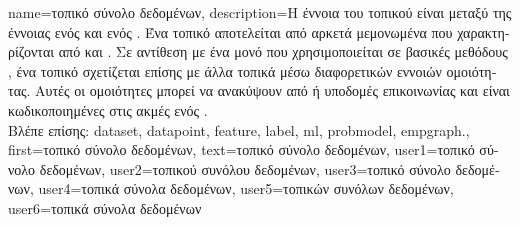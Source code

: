 {name={\foreignlanguage{greek}{τοπικό σύνολο δεδομένων}},
	description={\foreignlanguage{greek}{Η έννοια του τοπικού}   
		\foreignlanguage{greek}{εί\-ναι μεταξύ της έννοιας ενός}  \foreignlanguage{greek}{και ενός} . 
		\foreignlanguage{greek}{Ένα τοπικό}  \foreignlanguage{greek}{αποτελείται από αρκετά μεμονωμένα} 
		 \foreignlanguage{greek}{που χαρακτηρίζονται από}  \foreignlanguage{greek}{και} 
		. \foreignlanguage{greek}{Σε αντίθεση με ένα μονό}  \foreignlanguage{greek}{που 
		χρησιμοποιείται σε βασικές μεθόδους} , \foreignlanguage{greek}{ένα τοπικό}  
		\foreignlanguage{greek}{σχετίζεται επίσης με άλλα τοπικά}  \foreignlanguage{greek}{μέσω διαφορετικών εννοιών 
		ομοιότητας. Αυτές οι ομοιότητες μπορεί να ανακύψουν από}  \foreignlanguage{greek}{ή υποδομές επικοινωνίας 
		και είναι κωδικοποιημένες στις ακμές ενός} .\\
		\foreignlanguage{greek}{Βλέπε επίσης:} \gls{dataset}, \gls{datapoint}, \gls{feature}, \gls{label}, \gls{ml}, \gls{probmodel}, \gls{empgraph}.},
	first={\foreignlanguage{greek}{τοπικό σύνολο δεδομένων}},
	text={\foreignlanguage{greek}{τοπικό σύνολο δεδομένων}},
	user1={\foreignlanguage{greek}{τοπικό σύνολο δεδομένων}}, %
	user2={\foreignlanguage{greek}{τοπικού συνόλου δεδομένων}}, %
	user3={\foreignlanguage{greek}{τοπικό σύνολο δεδομένων}}, %
	user4={\foreignlanguage{greek}{τοπικά σύνολα δεδομένων}}, %
	user5={\foreignlanguage{greek}{τοπικών συνόλων δεδομένων}}, %
	user6={\foreignlanguage{greek}{τοπικά σύνολα δεδομένων}} %
}


